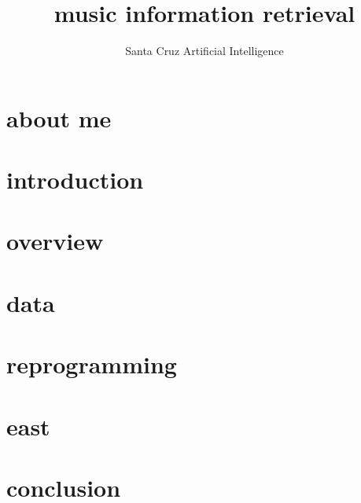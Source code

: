 

\title{music information retrieval}
\subtitle{Santa Cruz Artificial Intelligence} 


	

    \section[about]{about me}
        
        
    \section[intro]{introduction}
        
        
    \section{overview}        
		
        
    \section{data}
        
    
    
    \section{reprogramming}
        
    
    \section{east}
        
    

    \section{conclusion}
        
        



